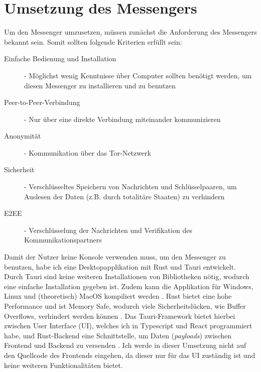 \documentclass[a4paper,ngerman, headheight=28pt,12pt]{scrartcl}
\newcommand{\vcite}[1]{\cite[vgl.][]{#1}}
\begin{document}
\section{Umsetzung des Messengers}
Um den Messenger umzusetzen, müssen zunächst die Anforderung des Messengers bekannt sein. Somit sollten folgende Kriterien erfüllt sein:
\begin{description}
  \item[Einfache Bedienung und Installation] - Möglichst wenig Kenntnisse über Computer sollten benötigt werden, um diesen Messenger zu installieren und zu benutzen
  \item[Peer-to-Peer-Verbindung] - Nur über eine direkte Verbindung miteinander kommunizieren
  \item[Anonymität] - Kommunikation über das Tor-Netzwerk
  \item[Sicherheit] - Verschlüsseltes Speichern von Nachrichten und Schlüsselpaaren, um Auslesen der Daten (z.B. durch totalitäre Staaten) zu verhindern
  \item[E2EE] - Verschlüsselung der Nachrichten und Verifikation des Kommunikationspartners
\end{description}
Damit der Nutzer keine Konsole verwenden muss, um den Messenger zu benutzen, habe ich eine Desktopapplikation mit Rust und Tauri entwickelt. Durch Tauri sind keine weiteren Installationen von Bibliotheken nötig, wodurch eine einfache Installation gegeben ist. %
Zudem kann die Applikation für Windows, Linux und (theoretisch) MacOS kompiliert werden \vcite{RustCompile}. Rust bietet eine hohe Performance und ist Memory Safe, wodurch viele Sicherheitslücken, wie Buffer Overflows, verhindert werden können \vcite{RustSecurity}. Das Tauri-Framework bietet hierbei zwischen User Interface (UI), welches ich in Typescript und React programmiert habe, und Rust-Backend eine Schnittstelle, um Daten (\textit{payloads}) zwischen Frontend und Backend zu versenden \vcite{TauriPayloads}. Ich werde in dieser Umsetzung nicht auf den Quellcode des Frontends eingehen, da dieser nur für das UI zuständig ist und keine weiteren Funktionalitäten bietet.
\end{document}
